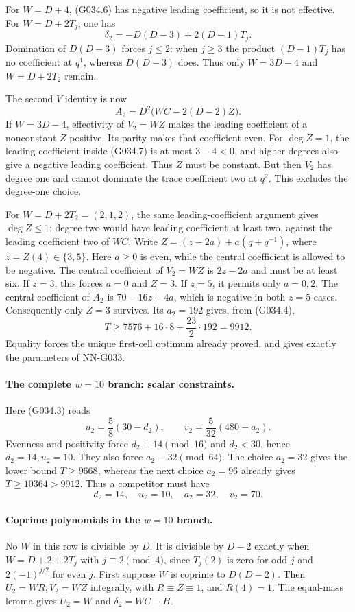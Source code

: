 For $W=D+4$, (G034.6) has negative leading coefficient,
so it is not effective. For $W=D+2T_j$, one has
\[
             \delta_2=-D(D-3)+2(D-1)T_j.
\]
Domination of $D(D-3)$ forces $j\le2$: when $j\ge3$
the product $(D-1)T_j$ has no coefficient at $q^1$,
whereas $D(D-3)$ does. Thus only $W=3D-4$ and
$W=D+2T_2$ remain.

The second $V$ identity is now
\[
              A_2=D^2\bigl(WC-2(D-2)Z\bigr).         \tag{G034.7}
\]
If $W=3D-4$, effectivity of $V_2=WZ$ makes the leading
coefficient of a nonconstant $Z$ positive. Its parity
makes that coefficient even. For $\deg Z=1$,
the leading coefficient inside (G034.7) is at most
$3-4<0$, and higher degrees also give a negative
leading coefficient. Thus $Z$ must be constant.
But then $V_2$ has degree one and cannot dominate
the trace coefficient two at $q^2$. This excludes
the degree-one choice.

For $W=D+2T_2=(2,1,2)$, the same leading-coefficient
argument gives $\deg Z\le1$: degree two would have
leading coefficient at least two, against the leading
coefficient two of $WC$.
Write $Z=(z-2a)+a(q+q^{-1})$, where $z=Z(4)\in\{3,5\}$.
Here $a\ge0$ is even, while the central coefficient
is allowed to be negative. The central coefficient
of $V_2=WZ$ is $2z-2a$ and must be at least six.
If $z=3$, this forces $a=0$ and $Z=3$.
If $z=5$, it permits only $a=0,2$.
The central coefficient of $A_2$ is
$70-16z+4a$, which is negative in both $z=5$ cases.
Consequently only $Z=3$ survives. Its $a_2=192$
gives, from (G034.4),
\[
                  T\ge7576+16\cdot8+\frac{23}{2}\cdot192
                    =9912.                         \tag{G034.8}
\]
Equality forces the unique first-cell optimum already
proved, and gives exactly the parameters of NN-G033.

\paragraph{The complete $w=10$ branch: scalar constraints.}
Here (G034.3) reads
\[
 u_2=\frac58(30-d_2),\qquad
 v_2=\frac5{32}(480-a_2).
\]
Evenness and positivity force $d_2\equiv14\pmod{16}$
and $d_2<30$, hence $d_2=14,u_2=10$.
They also force $a_2\equiv32\pmod{64}$.
The choice $a_2=32$ gives the lower bound $T\ge9668$,
whereas the next choice $a_2=96$ already gives
$T\ge10364>9912$. Thus a competitor must have
\[
                  d_2=14,\quad u_2=10,\quad
                  a_2=32,\quad v_2=70.               \tag{G034.9}
\]

\paragraph{Coprime polynomials in the $w=10$ branch.}
No $W$ in this row is divisible by $D$.
It is divisible by $D-2$ exactly when
$W=D+2+2T_j$ with $j\equiv2\pmod4$, since
$T_j(2)$ is zero for odd $j$ and
$2(-1)^{j/2}$ for even $j$.
First suppose $W$ is coprime to $D(D-2)$.
Then $U_2=WR,V_2=WZ$ integrally, with
$R\equiv Z\equiv1$, and $R(4)=1$.
The equal-mass lemma gives $U_2=W$ and
$\delta_2=WC-H$.

